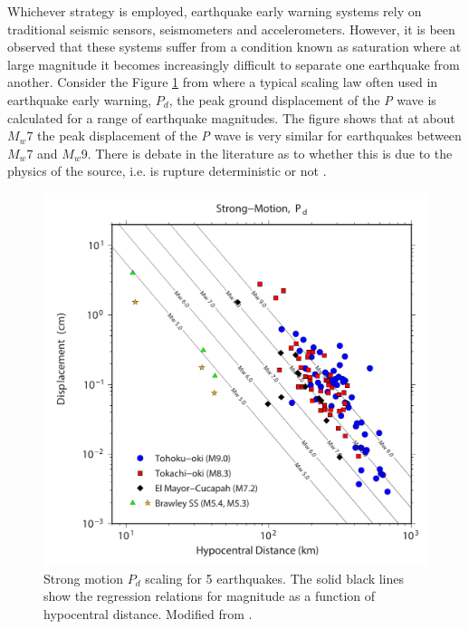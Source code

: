 Whichever strategy is employed, earthquake early warning systems rely on traditional seismic sensors, seismometers and accelerometers. However, it is been observed that these systems suffer from a condition known as saturation \citep{Brown2011} where at large magnitude it becomes increasingly difficult to separate one earthquake from another. Consider the Figure \ref{fig_pd_scaling} from \citet{Crowell2013} where a typical scaling law often used in earthquake early warning, $P_d$, the peak ground displacement of the \textit{P} wave \citep{wu2007_Pd} is calculated for a range of earthquake magnitudes. The figure shows that at about $M_w$7 the peak displacement of the \textit{P} wave is very similar for earthquakes between $M_w$7 and $M_w$9. There is debate in the literature as to whether this is due to the physics of the source, i.e. is rupture deterministic or not \citep{olson2005}.

\begin{figure}[!ht] 
  \centering
  \includegraphics[width=0.99\linewidth]{./figures/ch1/pd_scaling.pdf}
    \caption[Strong motion $P_d$ scaling]{Strong motion $P_d$ scaling for 5 earthquakes. The solid black lines show the regression relations for magnitude as a function of hypocentral distance. Modified from \citet{Crowell2013}.}
  \label{fig_pd_scaling}
\end{figure}

